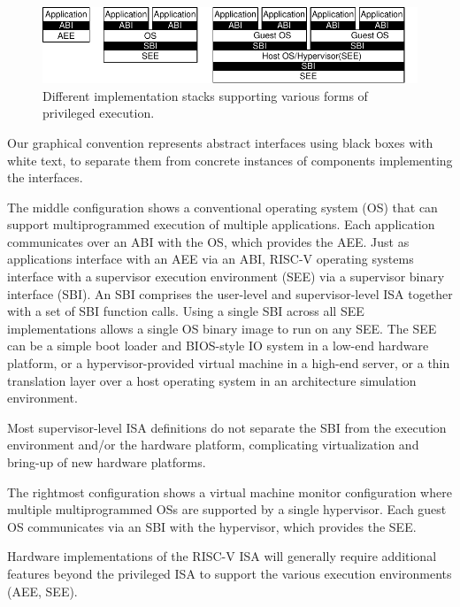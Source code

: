 \begin{figure}[th]
\centering
\includegraphics[width=\textwidth]{figs/privimps.pdf}
\caption{Different implementation stacks supporting various forms of
  privileged execution.}
\label{fig:privimps}
\end{figure}

\begin{commentary}
Our graphical convention represents abstract interfaces using black
boxes with white text, to separate them from concrete instances of
components implementing the interfaces.
\end{commentary}

The middle configuration shows a conventional operating system (OS)
that can support multiprogrammed execution of multiple
applications. Each application communicates over an ABI with the OS,
which provides the AEE.  Just as applications interface with an AEE
via an ABI, RISC-V operating systems interface with a supervisor
execution environment (SEE) via a supervisor binary interface (SBI).
An SBI comprises the user-level and supervisor-level ISA together with
a set of SBI function calls.  Using a single SBI across all SEE
implementations allows a single OS binary image to run on any SEE.
The SEE can be a simple boot loader and BIOS-style IO system in a
low-end hardware platform, or a hypervisor-provided virtual machine in
a high-end server, or a thin translation layer over a host operating
system in an architecture simulation environment.

\begin{commentary}
Most supervisor-level ISA definitions do not separate the SBI from the
execution environment and/or the hardware platform, complicating
virtualization and bring-up of new hardware platforms.
\end{commentary}

The rightmost configuration shows a virtual machine monitor
configuration where multiple multiprogrammed OSs are supported by a
single hypervisor.  Each guest OS communicates via an SBI with the
hypervisor, which provides the SEE.

Hardware implementations of the RISC-V ISA will generally require
additional features beyond the privileged ISA to support the various
execution environments (AEE, SEE).

